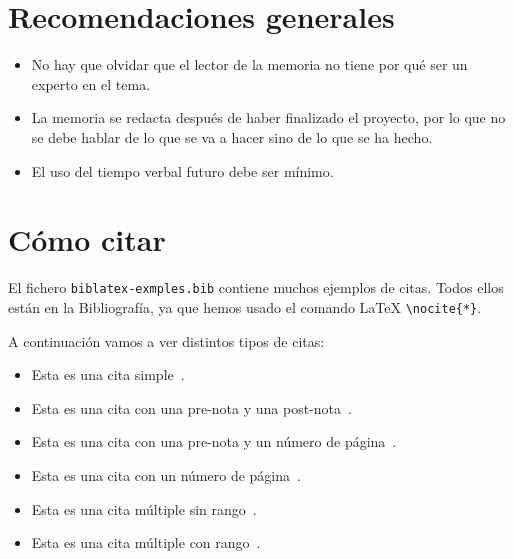 \documentclass[a4paper,12pt]{report}
\begin{document}
\printglossary[nonumberlist,type=\acronymtype,title={Acrónimos}]

\clearpage
\glsaddall
\printglossary[nonumberlist]

\clearpage
\nocite{*}
\printbibliography[heading=bibintoc,title={Referencias}]

\begin{appendices}

\chapter{Recomendaciones generales}

\begin{itemize}
\item No hay que olvidar que el lector de la memoria no tiene por qué ser un experto en el tema.
\item La memoria se redacta después de haber finalizado el proyecto, por lo que 
no se debe hablar de lo que se va a hacer sino de lo que se ha hecho.
\item El uso del tiempo verbal futuro debe ser mínimo.
\end{itemize}

\chapter{Cómo citar}

El fichero \texttt{biblatex-exmples.bib} contiene muchos ejemplos de citas. 
Todos ellos están en la Bibliografía, ya que hemos usado el comando \LaTeX{} \texttt{\textbackslash nocite\{*\}}.

A continuación vamos a ver distintos tipos de citas:
\begin{itemize}
    \item Esta es una cita simple~\cite{westfahl:space}.
    \item Esta es una cita con una pre-nota y una post-nota~\cite[pre-nota][post-nota]{westfahl:space}.
    \item Esta es una cita con una pre-nota y un número de página~\cite[pre-nota][42]{westfahl:space}.
    \item Esta es una cita con un número de página~\cite[][42]{westfahl:space}.
    \item Esta es una cita múltiple sin rango~\cites{westfahl:space, aksin}.
    \item Esta es una cita múltiple con rango~\cites{westfahl:space, angenendt, aksin}.
\end{itemize} 


\end{appendices}
\end{document}

